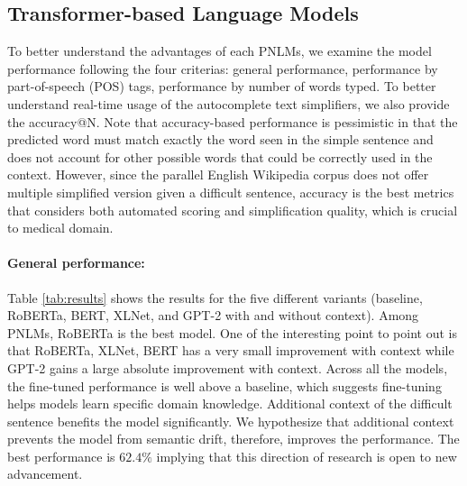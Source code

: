 \documentclass[11pt]{article}
\begin{document}
\subsection{Transformer-based Language Models}

To better understand the advantages of each PNLMs, we examine the model performance following the four criterias: general performance, performance by part-of-speech (POS) tags, performance by number of words typed. To better understand real-time usage of the autocomplete text simplifiers, we also provide the accuracy@N. Note that accuracy-based performance is pessimistic in that the predicted word must match exactly the word seen in the simple sentence and does not account for other possible words that could be correctly used in the context. However, since the parallel English Wikipedia corpus does not offer multiple simplified version given a difficult sentence, accuracy is the best metrics that considers both automated scoring and simplification quality, which is crucial to medical domain. 

\paragraph{General performance:} Table \ref{tab:results} shows the results for the five different variants (baseline, RoBERTa, BERT, XLNet, and GPT-2 with and without context). Among PNLMs, RoBERTa is the best model. One of the interesting point to point out is that RoBERTa, XLNet, BERT has a very small improvement with context while GPT-2 gains a large absolute improvement with context. Across all the models, the fine-tuned performance is well above a baseline, which suggests fine-tuning helps models learn specific domain knowledge. Additional context of the difficult sentence benefits the model significantly. We hypothesize that additional context prevents the model from semantic drift, therefore, improves the performance. The best performance is $62.4\%$ implying that this direction of research is open to new advancement.
\end{document}
